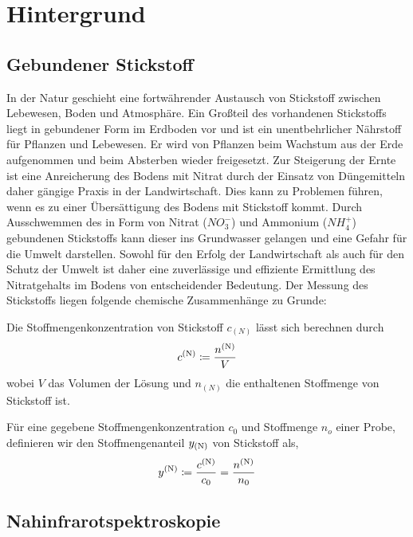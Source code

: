 \section{Hintergrund}
\label{sec:Hintergrund}

	\subsection{Gebundener Stickstoff}
	\label{ssec:Gebundener Stickstoff}

	In der Natur geschieht eine fortwährender Austausch von Stickstoff zwischen Lebewesen, Boden und Atmosphäre.
	Ein Großteil des vorhandenen Stickstoffs liegt in gebundener Form im Erdboden vor und ist ein unentbehrlicher Nährstoff für Pflanzen und Lebewesen.
	Er wird von Pflanzen beim Wachstum aus der Erde aufgenommen und beim Absterben wieder freigesetzt.
    Zur Steigerung der Ernte ist eine Anreicherung des Bodens mit Nitrat durch der Einsatz von Düngemitteln daher gängige Praxis in der Landwirtschaft.\cite{Umweltbundesamt2017}
    Dies kann zu Problemen führen, wenn es zu einer Übersättigung des Bodens mit Stickstoff kommt.
    Durch Ausschwemmen des in Form von Nitrat ($NO_3^-$) und Ammonium ($NH_4^+$) gebundenen Stickstoffs kann dieser ins Grundwasser gelangen und eine Gefahr für die Umwelt darstellen.
    Sowohl für den Erfolg der Landwirtschaft als auch für den Schutz der Umwelt ist daher eine zuverlässige und effiziente Ermittlung des Nitratgehalts im Bodens von entscheidender Bedeutung.
    Der Messung des Stickstoffs liegen folgende chemische Zusammenhänge zu Grunde:


    Die Stoffmengenkonzentration von Stickstoff $c_{(N)}$ lässt sich berechnen durch
    	\[
			c^{\mathrm{(N)}} \coloneqq \frac{n^{\mathrm{(N)}}}{V}
		\]
		wobei $V$ das Volumen der Lösung und $n_{(N)}$ die enthaltenen Stoffmenge von Stickstoff ist.

    Für eine gegebene Stoffmengenkonzentration $c_0$ und Stoffmenge $n_o$ einer Probe, definieren wir den Stoffmengenanteil $y_{\mathrm{(N)}}$ von Stickstoff als,
        \[
			y^{\mathrm{(N)}} \coloneqq \frac{c^{\mathrm{(N)}}}{c_0} = \frac{n^{\mathrm{(N)}}}{n_0}
		\]


	\subsection{Nahinfrarotspektroskopie}
	\label{ssec:Nahinfrarotspek}

